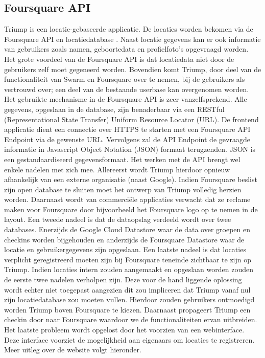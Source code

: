 \subsection{Foursquare API}
\label{Foursquare API}
Triump is een locatie-gebaseerde applicatie. De locaties worden bekomen via de Foursquare API en locatiedatabase \cite{FS_API_website}. Naast locatie gegevens kan er ook informatie van gebruikers zoals namen, geboortedata en profielfoto's opgevraagd worden. Het grote voordeel van de Foursquare API is dat locatiedata niet door de gebruikers zelf moet gegeneerd worden. Bovendien komt Triump, door deel van de functionaliteit van Swarm en Foursquare over te nemen, bij de gebruikers als vertrouwd over; een deel van de bestaande userbase kan overgenomen worden. Het gebruikte mechanisme in de Foursquare API is zeer vanzelfsprekend. Alle gegevens, opgeslaan in de database, zijn benaderbaar via een RESTful (Representational State Transfer) Uniform Resource Locator (URL). De frontend applicatie dient een connectie over HTTPS te starten met een Foursquare API Endpoint via de gewenste URL. Vervolgens zal de API Endpoint de gevraagde informatie in Javascript Object Notation (JSON) formaat terugzenden. JSON is een gestandaardiseerd gegevensformaat. 
Het werken met de API brengt wel enkele nadelen met zich mee.
Allereerst wordt Triump hierdoor opnieuw afhankelijk van een externe organisatie (naast Google). Indien Foursquare beslist zijn open database te sluiten moet het ontwerp van Triump volledig herzien worden. Daarnaast wordt van commerciële applicaties verwacht dat ze reclame maken voor Foursquare door bijvoorbeeld het Foursquare logo op te nemen in de layout.  Een tweede nadeel is dat de dataopslag verdeeld wordt over twee databases. Enerzijds de Google Cloud Datastore waar de data over groepen en checkins worden bijgehouden en anderzijds de Foursquare Datastore waar de locatie en gebruikergegevens zijn opgeslaan. Een laatste nadeel is dat locaties verplicht geregistreerd moeten zijn bij Foursquare teneinde zichtbaar te zijn op Triump. Indien locaties intern zouden aangemaakt en opgeslaan worden zouden de eerste twee nadelen verholpen zijn. Deze voor de hand liggende oplossing wordt echter niet toegepast aangezien dit zou impliceren dat Triump vanaf nul zijn locatiedatabase zou moeten vullen. Hierdoor zouden gebruikers ontmoedigd worden Triump boven Foursquare te kiezen. Daarnaast propageert Triump een checkin door naar Foursquare waardoor we de functionaliteiten ervan uitbreiden. Het laatste probleem wordt opgelost door het voorzien van een webinterface. Deze interface voorziet de mogelijkheid aan eigenaars om locaties te registreren. Meer uitleg over de website volgt hieronder.

